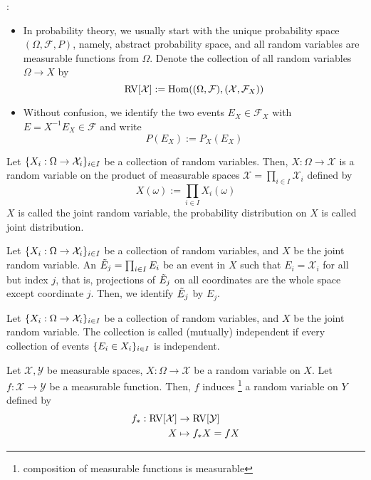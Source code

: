 \documentclass{report}
\begin{document}
\begin{remark}:
    \begin{itemize}
        \item In probability theory, we usually start with the unique probability space $(\Omega, \mathcal{F}, P)$, namely, abstract probability space, and all random variables are measurable functions from $\Omega$. Denote the collection of all random variables $\Omega \to X$ by 
        $$
            \operatorname{RV}[\mathcal{X}] := \operatorname{Hom}((\Omega, \mathcal{F}), (\mathcal{X}, \mathcal{F}_X))
        $$
        
        \item Without confusion, we identify the two events $E_X \in \mathcal{F}_X$ with $E = X^{-1} E_X \in \mathcal{F}$ and write
        $$
        	P(E_X) := P_X(E_X)
        $$
    \end{itemize}
\end{remark}

\begin{definition}
    Let $\{X_i: \Omega \to \mathcal{X}_i\}_{i \in I}$ be a collection of random variables. Then, $X: \Omega \to \mathcal{X}$ is a random variable on the product of measurable spaces $\mathcal{X} = \prod_{i \in I} \mathcal{X}_i$ defined by
    $$
        X(\omega) := \prod_{i \in I} X_i(\omega)
    $$
    $X$ is called the joint random variable, the probability distribution on $X$ is called joint distribution.
\end{definition}

\begin{remark}
    Let $\{X_i: \Omega \to \mathcal{X}_i\}_{i \in I}$ be a collection of random variables, and $X$ be the joint random variable. An $\Tilde{E}_j = \prod_{i \in I} E_i$ be an event in $X$ such that $E_i = \mathcal{X}_i$ for all but index $j$, that is, projections of $\Tilde{E}_j$ on all coordinates are the whole space except coordinate $j$. Then, we identify $\Tilde{E}_j$ by $E_j$.
\end{remark}

\begin{definition}
    Let $\{X_i: \Omega \to \mathcal{X}_i\}_{i \in I}$ be a collection of random variables, and $X$ be the joint random variable. The collection is called (mutually) independent if every collection of events $\{E_i \in X_i\}_{i \in I}$ is independent.
\end{definition}

\begin{definition}
    Let $\mathcal{X}, \mathcal{Y}$ be measurable spaces, $X: \Omega \to \mathcal{X}$ be a random variable on $X$. Let $f: \mathcal{X} \to \mathcal{Y}$ be a measurable function. Then, $f$ induces \footnote{composition of measurable functions is measurable} a random variable on $Y$ defined by
    \begin{align*}
        f_*: \operatorname{RV}[\mathcal{X}] &\to \operatorname{RV}[\mathcal{Y}] \\
        X &\mapsto f_* X = f X
    \end{align*}
\end{definition}
\end{document}
